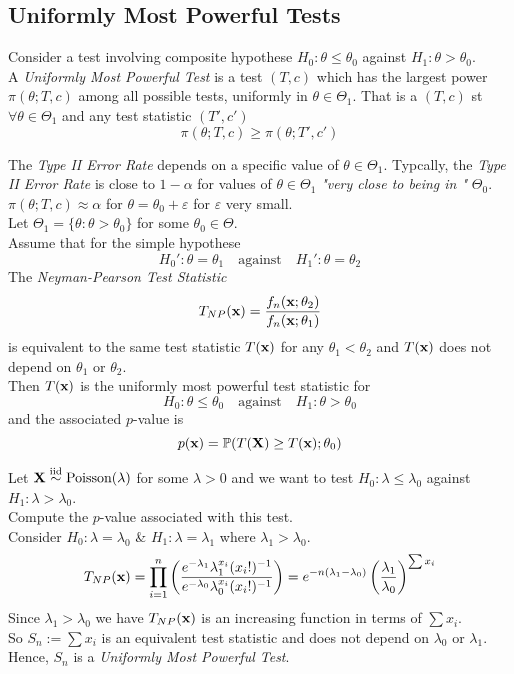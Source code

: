 \documentclass[11pt,a4paper]{article}
\begin{document}
\subsection{Uniformly Most Powerful Tests}

Consider a test involving composite hypothese $H_0:\theta\leq\theta_0$ against $H_1:\theta>\theta_0$.\\
A \textit{Uniformly Most Powerful Test} is a test $(T,c)$ which has the largest power $\pi(\theta;T,c)$ among all possible tests, uniformly in $\theta\in\Theta_1$. That is a $(T,c)$ st $\forall\theta\in\Theta_1$ and any test statistic $(T',c')$
$$\pi(\theta;T,c)\geq\pi(\theta;T',c')$$

\remark{}
The \textit{Type II Error Rate} depends on a specific value of $\theta\in\Theta_1$. Typcally, the \textit{Type II Error Rate} is close to $1-\alpha$ for values of $\theta\in\Theta_1$ \textit{"very close to being in "} $\Theta_0$. \ie $\pi(\theta;T,c)\approx\alpha$ for $\theta=\theta_0+\varepsilon$ for $\varepsilon$ very small.\\

\theorem{}
Let $\Theta_1=\{\theta:\theta>\theta_0\}$ for some $\theta_0\in\Theta$.\\
Assume that for the simple hypothese
$$H_0':\theta=\theta_1\quad\text{against}\quad H_1':\theta=\theta_2$$
The \textit{Neyman-Pearson Test Statistic}
$$T_{NP}(\textbf{x})=\frac{f_n(\textbf{x};\theta_2)}{f_n(\textbf{x};\theta_1)}$$
is equivalent to the same test statistic $T(\textbf{x})$ for any $\theta_1<\theta_2$ and $T(\textbf{x})$ does not depend on $\theta_1$ or $\theta_2$.\\
Then $T(\textbf{x})$ is the uniformly most powerful test statistic for
$$H_0:\theta\leq\theta_0\quad\text{against}\quad H_1:\theta>\theta_0$$
and the associated $p$-value is
$$p(\textbf{x})=\mathbb{P}(T(\textbf{X})\geq T(\textbf{x});\theta_0)$$

Let $\textbf{X}\overset{\text{iid}}{\sim}\text{Poisson}(\lambda)$ for some $\lambda>0$ and we want to test $H_0:\lambda\leq\lambda_0$ against $H_1:\lambda>\lambda_0$.\\
Compute the $p$-value associated with this test.\\
Consider $H_0:\lambda=\lambda_0$ \& $H_1:\lambda=\lambda_1$ where $\lambda_1>\lambda_0$.\\
$$T_{NP}(\textbf{x})=\prod_{i=1}^n\left(\dfrac{e^{-\lambda_1}\lambda_1^{x_i}(x_i!)^{-1}}{e^{-\lambda_0}\lambda_0^{x_i}(x_i!)^{-1}}\right)=e^{-n(\lambda_1-\lambda_0)}\left(\frac{\lambda_1}{\lambda_0}\right)^{\sum x_i}$$
Since $\lambda_1>\lambda_0$ we have $T_{NP}(\textbf{x})$ is an increasing function in terms of $\sum x_i$.\\
So $S_n:=\sum x_i$ is an equivalent test statistic and does not depend on $\lambda_0$ or $\lambda_1$.\\
Hence, $S_n$ is a \textit{Uniformly Most Powerful Test}.
\end{document}
